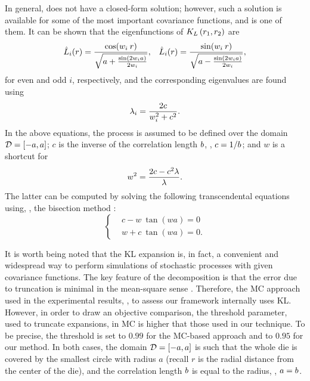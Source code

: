 In general,  does not have a closed-form solution; however, such a solution is available for some of the most important covariance functions, and  is one of them. It can be shown \cite{ghanem1991} that the eigenfunctions of $K_{L}\left(r_1, r_2\right)$ are
\begin{align*}
  & \hat{L}_i(r) = \frac{\cos(w_i \: r)}{\sqrt{a + \frac{\sin(2 w_i a)}{2 w_i}}}, & \hat{L}_i(r) = \frac{\sin(w_i \: r)}{\sqrt{a - \frac{\sin(2 w_i a)}{2 w_i}}},
\end{align*}
for even and odd $i$, respectively, and the corresponding eigenvalues are found using
\[
  \lambda_i = \frac{2 c}{w_i^2 + c^2}.
\]
In the above equations, the process is assumed to be defined over the domain $\mathcal{D} = [-a, a]$; $c$ is the inverse of the correlation length $b$, \ie, $c = 1 / b$; and $w$ is a shortcut for
\[
  w^2 = \frac{2 c - c^2 \lambda}{\lambda}.
\]
The latter can be computed by solving the following transcendental equations using, \eg, the bisection method \cite{press2007}:
\begin{equation*}
  \begin{cases}
    & c - w \: \tan (w a) = 0 \\
    & w + c \: \tan (w a) = 0.
  \end{cases}
\end{equation*}

It is worth being noted that the KL expansion is, in fact, a convenient and widespread way to perform simulations of stochastic processes with given covariance functions. The key feature of the decomposition is that the error due to truncation is minimal in the mean-square sense \cite{ghanem1991}. Therefore, the MC approach used in the experimental results, , to assess our framework internally uses KL. However, in order to draw an objective comparison, the threshold parameter, used to truncate expansions, in MC is higher that those used in our technique. To be precise, the threshold is set to $0.99$ for the MC-based approach and to $0.95$ for our method. In both cases, the domain $\mathcal{D} = [-a, a]$ is such that the whole die is covered by the smallest circle with radius $a$ (recall $r$ is the radial distance from the center of the die), and the correlation length $b$ is equal to the radius, \ie, $a = b$.
